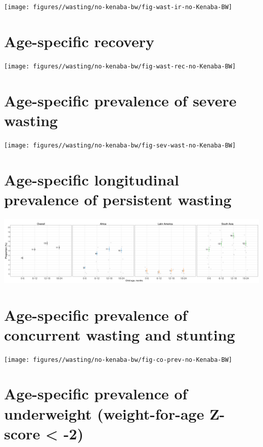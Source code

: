 \documentclass[
  9pt,
]{book}
\begin{document}
\texttt{[image: figures//wasting/no-kenaba-bw/fig-wast-ir-no-Kenaba-BW]}

\hypertarget{age-specific-recovery-1}{%
\section{Age-specific recovery}\label{age-specific-recovery-1}}

\texttt{[image: figures//wasting/no-kenaba-bw/fig-wast-rec-no-Kenaba-BW]}

\hypertarget{age-specific-prevalence-of-severe-wasting-2}{%
\section{Age-specific prevalence of severe wasting}\label{age-specific-prevalence-of-severe-wasting-2}}

\texttt{[image: figures//wasting/no-kenaba-bw/fig-sev-wast-no-Kenaba-BW]}

\hypertarget{age-specific-longitudinal-prevalence-of-persistent-wasting-2}{%
\section{Age-specific longitudinal prevalence of persistent wasting}\label{age-specific-longitudinal-prevalence-of-persistent-wasting-2}}

\includegraphics[width=41.67in]{figures//wasting/no-kenaba-bw/fig-pers-wast-no-Kenaba-BW}

\hypertarget{age-specific-prevalence-of-concurrent-wasting-and-stunting-2}{%
\section{Age-specific prevalence of concurrent wasting and stunting}\label{age-specific-prevalence-of-concurrent-wasting-and-stunting-2}}

\texttt{[image: figures//wasting/no-kenaba-bw/fig-co-prev-no-Kenaba-BW]}

\hypertarget{age-specific-prevalence-of-underweight-weight-for-age-z-score--2-1}{%
\section{Age-specific prevalence of underweight (weight-for-age Z-score \textless{} -2)}\label{age-specific-prevalence-of-underweight-weight-for-age-z-score--2-1}}
\end{document}
